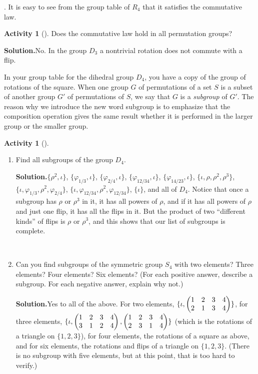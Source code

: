 \documentclass[10pt,]{book}
\theoremstyle{plain}
\theoremstyle{definition}
\newtheorem{activity}[project]{Activity}
\numberwithin{equation}{chapter}
\newcommand{\amp}{&}
\begin{document}
\varphi\circ\sigma\). It is easy to see from the group table of \(R_4\) that it satisfies the commutative law.%
\begin{activity}[]\label{activity-252}
Does the commutative law hold in all permutation groups?%
\par\medskip\noindent%
\textbf{Solution.}\quad No. In the group \(D_3\) a nontrivial rotation does not commute with a flip.%
\end{activity}
In your group table for the dihedral group \(D_4\), you have a copy of the group of rotations of the square. When one group \(G\) of permutations of a set \(S\) is a subset of another group \(G'\) of permutations of \(S\), we say that \(G\) is a \emph{subgroup} of \(G'\). The reason why we introduce the new word subgroup is to emphasize that the composition operation gives the same result whether it is performed in the larger group or the smaller group.%
\begin{activity}[]\label{S4}
~\par
\begin{enumerate}[label=(\alph*)]
 \item Find all subgroups of the group \(D_4\).%
\par\medskip\noindent%
\textbf{Solution.}\quad \(\{\rho^2,\!\iota\}\), \(\{\varphi_{1/3},\!\iota\}\), \(\{\varphi_{2/4},\!\iota\}\), \(\{\varphi_{12/34},\!\iota\}\), \(\{\varphi_{14/23},\!\iota\}\), \(\{\iota,\rho,\rho^2,\rho^3\}\), \(\{\iota,\varphi_{1/3},\rho^2,\varphi_{2/4}\}\), \(\{\iota,\varphi_{12/34},\rho^2,\varphi_{12/34}\}\), \(\{\iota\}\), and all of \(D_4\). Notice that once a subgroup has \(\rho\) or \(\rho^3\) in it, it has all powers of \(\rho\), and if it has all powers of \(\rho\) and just one flip, it has all the flips in it. But the product of two ``different kinds'' of flips is \(\rho\) or \(\rho^3\), and this shows that our list of subgroups is complete.%

~\par
\item Can you find subgroups of the symmetric group \(S_4\) with two elements? Three elements? Four elements? Six elements? (For each positive answer, describe a subgroup. For each negative answer, explain why not.)%
\par\medskip\noindent%
\textbf{Solution.}\quad Yes to all of the above. For two elements, \(\{\iota,\begin{pmatrix}1\amp 2\amp 3\amp 4\cr2\amp 1\amp 3\amp 4
\end{pmatrix} \}\), for three elements, \(\{\iota,\begin{pmatrix}1\amp 2\amp 3\amp 4\cr3\amp 1\amp 2\amp 4
\end{pmatrix} , \begin{pmatrix}1\amp 2\amp 3\amp 4\cr2\amp 3\amp 1\amp 4
\end{pmatrix} \}\) (which is the rotations of a triangle on \(\{1,2,3\}\)), for four elements, the rotations of a square as above, and for six elements, the rotations and flips of a triangle on \(\{1,2,3\}\). (There is no subgroup with five elements, but at this point, that is too hard to verify.)%

\end{enumerate}
\end{activity}
\end{document}
